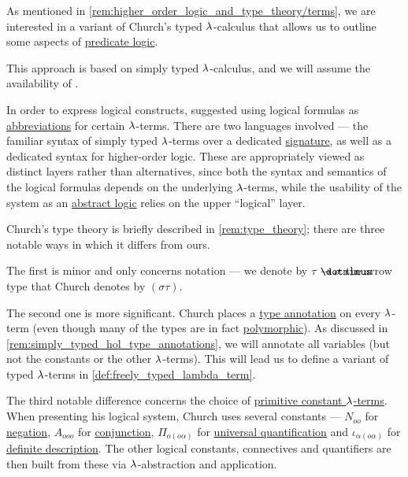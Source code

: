 \begin{remark}\label{rem:simply_typed_hol}
  As mentioned in \cref{rem:higher_order_logic_and_type_theory/terms}, we are interested in a variant of Church's typed \( {\mathrm \lambda} \)-calculus that allows us to outline some aspects of \hyperref[rem:predicate_logic]{predicate logic}.

  This approach is based on simply typed \( {\mathrm \lambda} \)-calculus, and we will assume the availability of .

  In order to express logical constructs,  suggested using logical formulas as \hyperref[con:metalingual_abbreviation]{abbreviations} for certain \( {\mathrm \lambda} \)-terms. There are two languages involved --- the familiar syntax of simply typed \( {\mathrm \lambda} \)-terms over a dedicated \hyperref[def:simple_type_signature]{signature}, as well as a dedicated syntax for higher-order logic. These are appropriately viewed as distinct layers rather than alternatives, since both the syntax and semantics of the logical formulas depends on the underlying \( {\mathrm \lambda} \)-terms, while the usability of the system as an \hyperref[def:abstract_logic]{abstract logic} relies on the upper \enquote{logical} layer.

  Church's type theory is briefly described in \cref{rem:type_theory}; there are three notable ways in which it differs from ours.

  The first is minor and only concerns notation --- we denote by \( \tau \synimplies \sigma \) the arrow type that Church denotes by \( (\sigma\tau) \).

  The second one is more significant. Church places a \hyperref[con:type_annotation]{type annotation} on every \( {\mathrm \lambda} \)-term (even though many of the types are in fact \hyperref[def:polymorphic_typed_lambda_calculus]{polymorphic}). As discussed in \cref{rem:simply_typed_hol_type_annotations}, we will annotate all variables (but not the constants or the other \( {\mathrm \lambda} \)-terms). This will lead us to define a variant of typed \( {\mathrm \lambda} \)-terms in \cref{def:freely_typed_lambda_term}.

  The third notable difference concerns the choice of \hyperref[con:primitive_notion]{primitive constant \( {\mathrm \lambda} \)-terms}. When presenting his logical system, Church uses several constants --- \( N_{oo} \) for \hyperref[def:propositional_alphabet/negation]{negation}, \( A_{ooo} \) for \hyperref[def:propositional_alphabet/connectives/conjunction]{conjunction}, \( \Pi_{o(o\alpha)} \) for \hyperref[def:predicate_logic_alphabet/quantifiers/universal]{universal quantification} and \( \iota_{\alpha(o\alpha)} \) for \hyperref[con:description_operator/iota]{definite description}. The other logical constants, connectives and quantifiers are then built from these via \( {\mathrm \lambda} \)-abstraction and application.


\end{remark}
